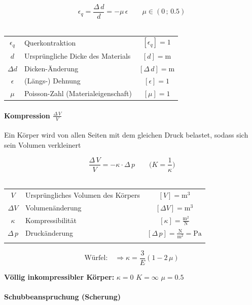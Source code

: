 		$$ \boxed{ \epsilon_q = \frac{\Delta \, d}{d} = - \mu \, \epsilon } \qquad \mu \in (0 \, ; \, 0.5)$$ \\
		
		\begin{tabular}{c l c}
		$\epsilon_q$ & Querkontraktion & $[\epsilon_q] = 1$ \\
		$d$ & Ursprüngliche Dicke des Materials & $[d] = \mathrm{m}$ \\
		$\Delta d$ & Dicken-Änderung & $[ \Delta \, d] = \mathrm{m}$ \\
		$\epsilon$ & (Längs-) Dehnung & $[\epsilon] = 1$ \\
		$\mu$ & Poisson-Zahl (Materialeigenschaft) & $[\mu] = 1$ \\
		\end{tabular}
		
		\paragraph{Kompression $\frac{\Delta \, V}{V}$}
		Ein Körper wird von allen Seiten mit dem gleichen Druck belastet, sodass sich sein Volumen verkleinert 
		
		$$ \boxed{ \frac{\Delta \, V}{V} = - \kappa \cdot \Delta \, p } \qquad \Big( K = \frac{1}{\kappa} \Big) $$ \\ 
		
		\begin{tabular}{c l c}
		$V$ & Ursprüngliches Volumen des Körpers & $[V] = \mathrm{m^3}$ \\
		$\Delta V$ & Volumenänderung & $[\Delta V] = \mathrm{m^3}$ \\
		$\kappa$ & Kompressibilität & $[\kappa] = \mathrm{\frac{m^2}{N}}$ \\
		$\Delta \, p$ & Druckänderung & $[\Delta \, p] = \mathrm{\frac{N}{m^2} = Pa}$  \\ 
		\\
		\end{tabular}
		
		$$ \boxed{ \text{Würfel:} \quad \Rightarrow \kappa = \frac{3}{E} (1 - 2 \, \mu) }$$ 
		
		\textbf{Völlig inkompressibler Körper:} $\kappa = 0$  \qquad $K = \infty$ \qquad $\mu = 0.5$
		
		
		\vfill\null
		\columnbreak
		
		
		
		\paragraph{Schubbeanspruchung (Scherung)}
		
